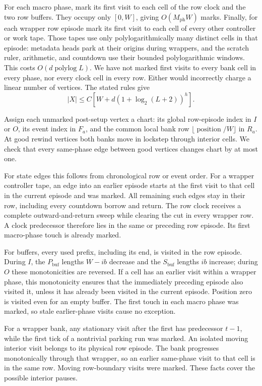 \begin{informalproof}
For each macro phase, mark its first visit to each cell of the row clock
and the two row buffers.  They occupy only $[0,W]$, giving $O(M_{\mathrm{ph}}W)$
marks.  Finally, for each wrapper row episode mark its first visit to
each cell of every other controller or work tape.  Those tapes use only
polylogarithmically many distinct cells in that episode: metadata heads
park at their origins during wrappers, and the scratch ruler, arithmetic,
and countdown use their bounded polylogarithmic windows.  This costs
$O(d\operatorname{polylog}L)$.  We have not marked first visits to every
bank cell in every phase, nor every clock cell in every row.  Either
would incorrectly charge a linear number of vertices.  The stated rules
give
\[
 |X|\le C[W+d(1+\log_2(L+2))^h].
\]

Assign each unmarked post-setup vertex a chart: its global row-episode
index in $I$ or $O$, its event index in $F_a$, and the common local bank
row $\lfloor\operatorname{position}/W\rfloor$ in $R_a$.  At good rewind
vertices both banks move in lockstep through interior cells.  We check
that every same-phase edge between good vertices changes chart by at
most one.

For state edges this follows from chronological row or event order.
For a wrapper controller tape, an edge into an earlier episode starts at
the first visit to that cell in the current episode and was marked.
All remaining such edges stay in their row, including every countdown
borrow and return.  The row clock receives a complete outward-and-return
sweep while clearing the cut in every wrapper row.  A clock predecessor
therefore lies in the same or preceding row episode.  Its first macro-phase
touch is already marked.

For buffers, every used prefix, including its end, is visited in the row
episode.  During $I$, the $P_{\mathrm{buf}}$ lengths $W-ib$ decrease and the
$S_{\mathrm{buf}}$ lengths $ib$ increase; during $O$ these monotonicities are
reversed.  If a cell has an earlier visit within a wrapper phase, this
monotonicity ensures that the immediately preceding episode also visited
it, unless it has already been visited in the current episode.  Position
zero is visited even for an empty buffer.  The first touch in each macro
phase was marked, so stale earlier-phase visits cause no exception.

For a wrapper bank, any stationary visit after the first has predecessor
$t-1$, while the first tick of a nontrivial parking run was marked.  An
isolated moving interior visit belongs to its physical row episode.
The bank progresses monotonically through that wrapper, so an earlier
same-phase visit to that cell is in the same row.  Moving row-boundary
visits were marked.  These facts cover the possible interior pauses.


\end{informalproof}
